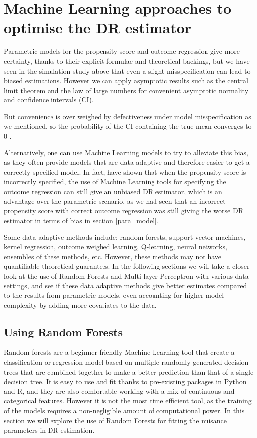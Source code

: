 \documentclass[12pt,twoside]{article}
\begin{document}
\clearpage
\section{Machine Learning approaches to optimise the DR estimator}

Parametric models for the propensity score and outcome regression give more certainty, thanks to their explicit formulae and theoretical backings, but we have seen in the simulation study above that even a slight misspecification can lead to biased estimations. However we can apply asymptotic results such as the central limit theorem and the law of large numbers for convenient asymptotic normality and confidence intervals (CI).

But convenience is over weighed by defectiveness under model misspecification as we mentioned, so the probability of the CI containing the true mean converges to 0 \citep{diaz}.

Alternatively, one can use Machine Learning models to try to alleviate this bias, as they often provide models that are data adaptive and therefore easier to get a correctly specified model. In fact, \citet{ps_SL} have shown that when the propensity score is incorrectly specified, the use of Machine Learning tools for specifying the outcome regression can still give an unbiased DR estimator, which is an advantage over the parametric scenario, as we had seen that an incorrect propensity score with correct outcome regression was still giving the worse DR estimator in terms of bias in section \ref{para_model}.

Some data adaptive methods include: random forests, support vector machines, kernel regression, outcome weighed learning, Q-learning, neural networks, ensembles of these methods, etc. However, these methods may not have quantifiable theoretical guarantees. In the following sections we will take a closer look at the use of Random Forests and Multi-layer Perceptron  with various data settings, and see if these data adaptive methods give better estimates compared to the results from parametric models, even accounting for higher model complexity by adding more covariates to the data.

\subsection{Using Random Forests}

Random forests are a beginner friendly Machine Learning tool that create a classification or regression model based on multiple randomly generated decision trees that are combined together to make a better prediction than that of a single decision tree. It is easy to use and fit thanks to pre-existing packages in Python and R, and they are also comfortable working with a mix of continuous and categorical features. However it is not the most time efficient tool, as the training of the models requires a non-negligible amount of computational power. In this section we will explore the use of Random Forests for fitting the nuisance parameters in DR estimation.
\end{document}
